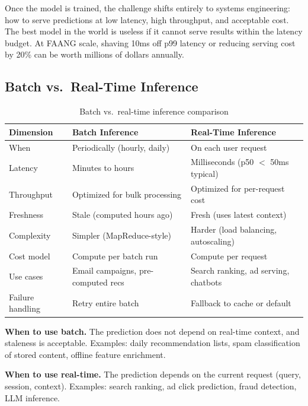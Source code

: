 \begin{keyinsight}
Once the model is trained, the challenge shifts entirely to systems engineering: how to serve predictions at low latency, high throughput, and acceptable cost. The best model in the world is useless if it cannot serve results within the latency budget. At FAANG scale, shaving 10ms off p99 latency or reducing serving cost by 20\% can be worth millions of dollars annually.
\end{keyinsight}

\subsection{Batch vs.\ Real-Time Inference}

\begin{table}[H]
\centering
\caption{Batch vs.\ real-time inference comparison}
\begin{tabularx}{\textwidth}{lXX}
\toprule
\textbf{Dimension} & \textbf{Batch Inference} & \textbf{Real-Time Inference} \\
\midrule
When & Periodically (hourly, daily) & On each user request \\
Latency & Minutes to hours & Milliseconds (p50 $<$ 50ms typical) \\
Throughput & Optimized for bulk processing & Optimized for per-request cost \\
Freshness & Stale (computed hours ago) & Fresh (uses latest context) \\
Complexity & Simpler (MapReduce-style) & Harder (load balancing, autoscaling) \\
Cost model & Compute per batch run & Compute per request \\
Use cases & Email campaigns, pre-computed recs & Search ranking, ad serving, chatbots \\
Failure handling & Retry entire batch & Fallback to cache or default \\
\bottomrule
\end{tabularx}
\end{table}

\textbf{When to use batch.} The prediction does not depend on real-time context, and staleness is acceptable. Examples: daily recommendation lists, spam classification of stored content, offline feature enrichment.

\textbf{When to use real-time.} The prediction depends on the current request (query, session, context). Examples: search ranking, ad click prediction, fraud detection, LLM inference.

